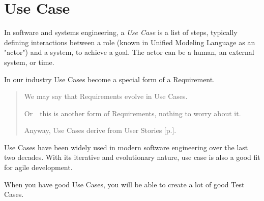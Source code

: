 \section{Use Case}
\label{sec:Use Case}

In software and systems engineering, a \emph{Use Case} is a list of steps, typically defining interactions between a role (known in Unified Modeling Language as an "actor") and a system, to achieve a goal. The actor can be a human, an external system, or time.

In our industry Use Cases become a special form of a Requirement.

\begin{quote}
We may say that Requirements evolve in Use Cases.

Or~\textemdash~this is another form of Requirements, nothing to worry about it.

Anyway, Use Cases derive from User Stories [p.\pageref{sec:User Story}].
\end{quote} 

Use Cases have been widely used in modern software engineering over the last two decades. With its iterative and evolutionary nature, use case is also a good fit for agile development.

When you have good Use Cases, you will be able to create a lot of good Test Cases.
